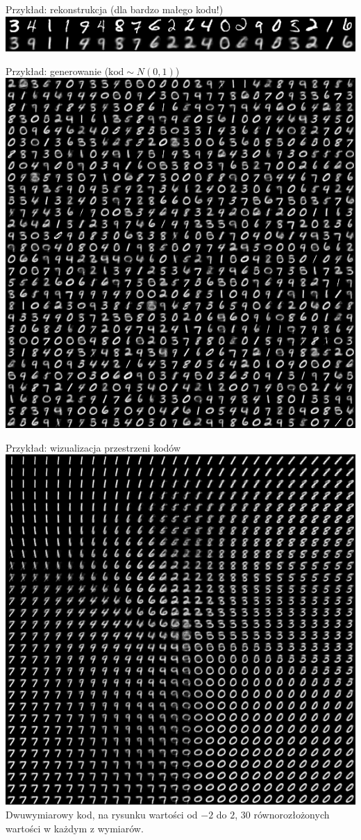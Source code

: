 \documentclass{sa}
\begin{document}
\begin{frame}{Przykład: rekonstrukcja (dla bardzo małego kodu!)}
	\includegraphics[width=\textwidth]{vae-rekonstrukcja.png}
\end{frame}
\begin{frame}{Przykład: generowanie ($\text{kod}\sim N(0,1)$)}
	\includegraphics[width=\textwidth]{vae-generator.png}
\end{frame}
\begin{frame}{Przykład: wizualizacja przestrzeni kodów}
	\includegraphics[width=\textwidth]{vae-latent.png}
	\note<1> {
		Dwuwymiarowy kod, na rysunku wartości od $-2$ do $2$, 30 równorozłożonych wartości w każdym z wymiarów.
	}
\end{frame}
\end{document}

